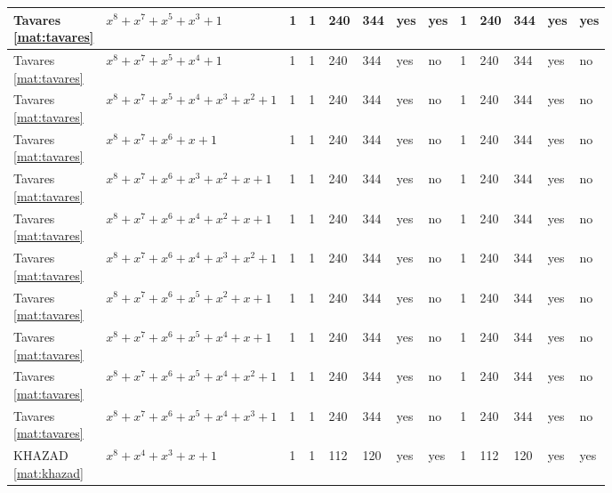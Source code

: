 \begin{tiny}
\begin{longtable}{|l|l|l|l|l|l|l|l|l|l|l|l|l|}
\shortstack{Tavares \\ \eqref{mat:tavares}} & $x^8 + x^7 + x^5 + x^3 + 1$ & 1 & 1 & 240 & 344 & yes & yes & 1 & 240 & 344 & yes & yes \\ \hline
\shortstack{Tavares \\ \eqref{mat:tavares}} & $x^8 + x^7 + x^5 + x^4 + 1$ & 1 & 1 & 240 & 344 & yes & no & 1 & 240 & 344 & yes & no \\ \hline
\shortstack{Tavares \\ \eqref{mat:tavares}} & $x^8 + x^7 + x^5 + x^4 + x^3 + x^2 + 1$ & 1 & 1 & 240 & 344 & yes & no & 1 & 240 & 344 & yes & no \\ \hline
\shortstack{Tavares \\ \eqref{mat:tavares}} & $x^8 + x^7 + x^6 + x + 1$ & 1 & 1 & 240 & 344 & yes & no & 1 & 240 & 344 & yes & no \\ \hline
\shortstack{Tavares \\ \eqref{mat:tavares}} & $x^8 + x^7 + x^6 + x^3 + x^2 + x + 1$ & 1 & 1 & 240 & 344 & yes & no & 1 & 240 & 344 & yes & no \\ \hline
\shortstack{Tavares \\ \eqref{mat:tavares}} & $x^8 + x^7 + x^6 + x^4 + x^2 + x + 1$ & 1 & 1 & 240 & 344 & yes & no & 1 & 240 & 344 & yes & no \\ \hline
\shortstack{Tavares \\ \eqref{mat:tavares}} & $x^8 + x^7 + x^6 + x^4 + x^3 + x^2 + 1$ & 1 & 1 & 240 & 344 & yes & no & 1 & 240 & 344 & yes & no \\ \hline
\shortstack{Tavares \\ \eqref{mat:tavares}} & $x^8 + x^7 + x^6 + x^5 + x^2 + x + 1$ & 1 & 1 & 240 & 344 & yes & no & 1 & 240 & 344 & yes & no \\ \hline
\shortstack{Tavares \\ \eqref{mat:tavares}} & $x^8 + x^7 + x^6 + x^5 + x^4 + x + 1$ & 1 & 1 & 240 & 344 & yes & no & 1 & 240 & 344 & yes & no \\ \hline
\shortstack{Tavares \\ \eqref{mat:tavares}} & $x^8 + x^7 + x^6 + x^5 + x^4 + x^2 + 1$ & 1 & 1 & 240 & 344 & yes & no & 1 & 240 & 344 & yes & no \\ \hline
\shortstack{Tavares \\ \eqref{mat:tavares}} & $x^8 + x^7 + x^6 + x^5 + x^4 + x^3 + 1$ & 1 & 1 & 240 & 344 & yes & no & 1 & 240 & 344 & yes & no \\ \hline
\shortstack{KHAZAD \\ \eqref{mat:khazad}} & $x^8 + x^4 + x^3 + x + 1$ & 1 & 1 & 112 & 120 & yes & yes & 1 & 112 & 120 & yes & yes \\ \hline

\end{longtable}
\end{tiny}
